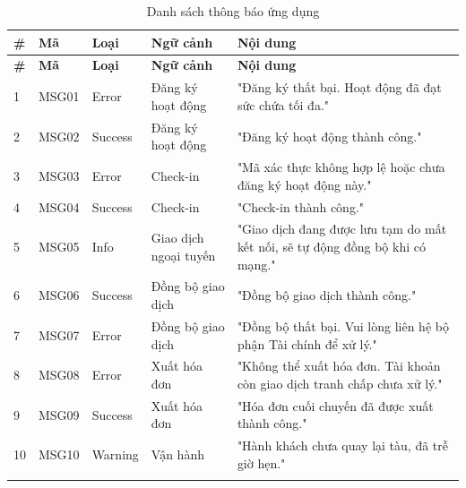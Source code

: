 \begin{longtable}{|p{0.6cm}|p{1.6cm}|p{1.5cm}|p{3cm}|p{6.5cm}|}
    \hline
    \textbf{\#} & \textbf{Mã} & \textbf{Loại} & \textbf{Ngữ cảnh} &
    \textbf{Nội dung} \\
    \hline
    \endfirsthead
    \hline
    \textbf{\#} & \textbf{Mã} & \textbf{Loại} & \textbf{Ngữ cảnh} &
    \textbf{Nội dung} \\
    \hline
    \endhead
    1 & MSG01 & Error & Đăng ký hoạt động & "Đăng ký thất bại. Hoạt động
    đã đạt sức chứa tối đa." \\
    \hline
    2 & MSG02 & Success & Đăng ký hoạt động & "Đăng ký hoạt động thành
    công." \\
    \hline
    3 & MSG03 & Error & Check-in & "Mã xác thực không hợp lệ hoặc chưa
    đăng ký hoạt động này." \\
    \hline
    4 & MSG04 & Success & Check-in & "Check-in thành công." \\
    \hline
    5 & MSG05 & Info & Giao dịch ngoại tuyến & "Giao dịch đang được lưu
    tạm do mất kết nối, sẽ tự động đồng bộ khi có mạng." \\
    \hline
    6 & MSG06 & Success & Đồng bộ giao dịch & "Đồng bộ giao dịch thành
    công." \\
    \hline
    7 & MSG07 & Error & Đồng bộ giao dịch & "Đồng bộ thất bại. Vui lòng
    liên hệ bộ phận Tài chính để xử lý." \\
    \hline
    8 & MSG08 & Error & Xuất hóa đơn & "Không thể xuất hóa đơn. Tài khoản
    còn giao dịch tranh chấp chưa xử lý." \\
    \hline
    9 & MSG09 & Success & Xuất hóa đơn & "Hóa đơn cuối chuyến đã được xuất
    thành công." \\
    \hline
    10 & MSG10 & Warning & Vận hành & "Hành khách chưa quay lại tàu, đã
    trễ giờ hẹn." \\
    \hline
    \caption{Danh sách thông báo ứng dụng}
    \label{tab:app-messages}
\end{longtable}
